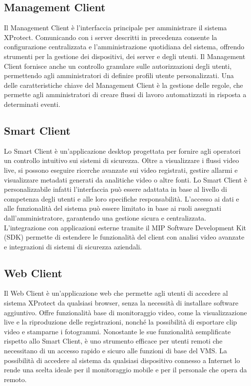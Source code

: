 \documentclass[a4paper, openright, thesis]{report}
\begin{document}
\subsection{Management Client}
Il Management Client è l'interfaccia principale per amministrare il sistema XProtect. Comunicando con i server descritti in precedenza consente la configurazione centralizzata e l’amministrazione quotidiana del sistema, offrendo strumenti per la gestione dei dispositivi, dei server e degli utenti. Il Management Client fornisce anche un controllo granulare sulle autorizzazioni degli utenti, permettendo agli amministratori di definire profili utente personalizzati.
Una delle caratteristiche chiave del Management Client è la gestione delle regole, che permette agli amministratori di creare flussi di lavoro automatizzati in risposta a determinati eventi.

\subsection{Smart Client}
Lo Smart Client \cite{smartclient} è un'applicazione desktop progettata per fornire agli operatori un controllo intuitivo sui sistemi di sicurezza. Oltre a visualizzare i flussi video live, si possono eseguire ricerche avanzate sui video registrati, gestire allarmi e visualizzare metadati generati da analitiche video o altre fonti.
Lo Smart Client è personalizzabile infatti l'interfaccia può essere adattata in base al livello di competenza degli utenti e alle loro specifiche responsabilità. L'accesso ai dati e alle funzionalità del sistema può essere limitato in base ai ruoli assegnati dall’amministratore, garantendo una gestione sicura e centralizzata.
L'integrazione con applicazioni esterne tramite il MIP Software Development Kit (SDK) \cite{sdk} permette di estendere le funzionalità del client con analisi video avanzate e integrazioni di sistemi di sicurezza aziendali.

\subsection{Web Client}
Il Web Client \cite{webclient} è un’applicazione web che permette agli utenti di accedere al sistema XProtect da qualsiasi browser, senza la necessità di installare software aggiuntivo. Offre funzionalità base di monitoraggio video, come la visualizzazione live e la riproduzione delle registrazioni, nonché la possibilità di esportare clip video e stamparne i fotogrammi.
Nonostante le sue funzionalità semplificate rispetto allo Smart Client, è uno strumento efficace per utenti remoti che necessitano di un accesso rapido e sicuro alle funzioni di base del VMS. La possibilità di accedere al sistema da qualsiasi dispositivo connesso a Internet lo rende una scelta ideale per il monitoraggio mobile e per il personale che opera da remoto.
\end{document}
